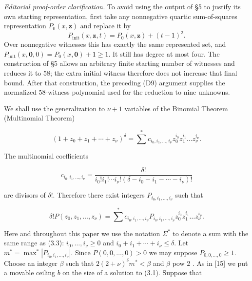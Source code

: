 \documentclass[11pt,a4paper]{article}
\newcommand{\origpage}[1]{\marginnote{\footnotesize\textbf{[#1]}}}
\begin{document}
\noindent\textit{Editorial proof-order clarification.} To avoid using the output of \S5 to justify its own starting representation, first take any nonnegative quartic sum-of-squares representation $P_0(x,\mathbf z)$ and replace it by
\[
 P_{\mathrm{init}}(x,\mathbf z,t)=P_0(x,\mathbf z)+(t-1)^2.
\]
Over nonnegative witnesses this has exactly the same represented set, and
$P_{\mathrm{init}}(x,\mathbf0,0)=P_0(x,\mathbf0)+1\geq1$.
It still has degree at most four. The construction of \S5 allows an arbitrary finite starting number of witnesses and reduces it to 58; the extra initial witness therefore does not increase that final bound. After that construction, the preceding (D9) argument supplies the normalized 58-witness polynomial used for the reduction to nine unknowns.

We shall use the generalization to $\nu+1$ variables of the Binomial Theorem (Multinomial Theorem)


\begin{equation*}
\left(1+z_{0}+z_{1}+\cdots+z_{\nu}\right)^{\delta}=\sum^{*} c_{i_{0}, i_{1}, \ldots, i_{\nu}} z_{0}^{i_{0}} z_{1}^{i_{1}} \ldots z_{\nu}^{i_{\nu}} . \tag{3.3}
\end{equation*}


\origpage{561}The multinomial coefficients


\begin{equation*}
c_{i_{0}, i_{1}, \ldots, i_{\nu}}=\frac{\delta!}{i_{0}!i_{1}!\cdots i_{\nu}!\left(\delta-i_{0}-i_{1}-\cdots-i_{\nu}\right)!} \tag{3.4}
\end{equation*}


are divisors of $\delta!$. Therefore there exist integers $P_{i_{0}, i_{1}, \ldots, i_{\nu}}$ such that


\begin{equation*}
\delta!P\left(z_{0}, z_{1}, \ldots, z_{\nu}\right)=\sum^{*} c_{i_{0}, i_{1}, \ldots, i_{\nu}} P_{i_{0}, i_{1}, \ldots, i_{\nu}} z_{0}^{i_{0}} z_{1}^{i_{1}} \ldots z_{\nu}^{i_{\nu}} . \tag{3.5}
\end{equation*}


Here and throughout this paper we use the notation $\Sigma^{*}$ to denote a sum with the same range as (3.3): $i_0,\allowbreak \ldots,\allowbreak i_\nu\geq0$ and $i_{0}+i_{1}+\cdots+i_{\nu} \leq \delta$. Let $m^{*}=\max ^{*}\left|P_{i_{0}, i_{1}, \ldots, i_{\nu}}\right|$. Since $P(0,\allowbreak 0,\allowbreak  \ldots,\allowbreak  0)>0$ we may suppose $P_{0,0, \ldots, 0} \geq 1$. Choose an integer $\beta$ such that $2(2+\nu)^{\delta} m^{*}<\beta$ and $\beta$ pow 2 . As in [15] we put a movable ceiling $b$ on the size of a solution to (3.1). Suppose that
\end{document}
